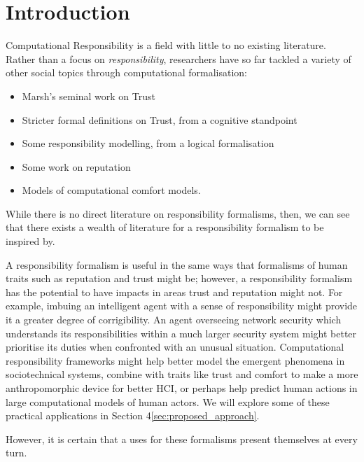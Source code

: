 \section{Introduction}\label{sec:intro}

Computational Responsibility is a field with little to no existing literature. Rather than a focus on \emph{responsibility}, researchers have so far tackled a variety of other social topics through computational formalisation:

\begin{itemize}
    \item Marsh's seminal work on Trust\cite{Marsh1994FormalisingConcept}
    
    \item Stricter formal definitions on Trust, from a cognitive standpoint\cite{CastelfranchiSocialApproach}
    
    \item Some responsibility modelling, from a logical formalisation\cite{Simpson2015FormalisingAnalysis}
    
    \item Some work on reputation~\cite{Chandrasekaran2011ASystems}

    \item Models of computational comfort models\cite{Marsh2011}.
    
\end{itemize}

While there is no direct literature on responsibility formalisms, then, we can see that there exists a wealth of literature for a responsibility formalism to be inspired by.\par

A responsibility formalism is useful in the same ways that formalisms of human traits such as reputation and trust might be; however, a responsibility formalism has the potential to have impacts in areas trust and reputation might not. For example, imbuing an intelligent agent with a sense of responsibility might provide it a greater degree of corrigibility\cite{corrigibility}. An agent overseeing network security which understands its responsibilities within a much larger security system might better prioritise its duties when confronted with an unusual situation. Computational responsibility frameworks might help better model the emergent phenomena in sociotechnical systems, combine with traits like trust and comfort to make a more anthropomorphic device for better HCI, or perhaps help predict human actions in large computational models of human actors. We will explore some of these practical applications in Section 4\cref{sec:proposed_approach}.

However, it is certain that a uses for these formalisms present themselves at every turn. 
